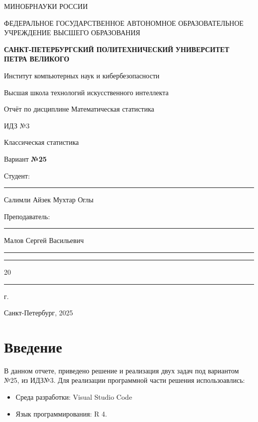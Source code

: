 \documentclass[areasetadvanced]{scrartcl}
\begin{document}
\sloppy
	\thispagestyle{empty}
	\begin{center}
		\large{МИНОБРНАУКИ РОССИИ} \par
		\vspace{0.3cm}
		\normalsize
		{ФЕДЕРАЛЬНОЕ ГОСУДАРСТВЕННОЕ АВТОНОМНОЕ ОБРАЗОВАТЕЛЬНОЕ УЧРЕЖДЕНИЕ ВЫСШЕГО ОБРАЗОВАНИЯ} \par
		\vspace{0.3cm}
		\textbf{\guillemotleft САНКТ-ПЕТЕРБУРГСКИЙ ПОЛИТЕХНИЧЕСКИЙ}
		\textbf{УНИВЕРСИТЕТ ПЕТРА ВЕЛИКОГО\guillemotright} \par
		\vspace{0.3cm}
		{Институт компьютерных наук и кибербезопасности}\par
		{Высшая школа технологий искусственного интеллекта}\par
	\end{center}
	\vfill
	\begin{center}
		{\large Отчёт по дисциплине \guillemotleft Математическая статистика\guillemotright}\par
		{\huge   ИДЗ №3
		
		\guillemotleft Классическая статистика\guillemotright}\par
            {\huge Вариант \textbf{№25}}
         
	\end{center}
	\vfill
	\begin{flushleft}
		Студент: \hspace{1.8cm} \rule[0pt]{2.5cm}{0.5pt}\hfill Салимли Айзек Мухтар Оглы\par
		\vspace{1.5cm}
		Преподаватель: \hspace{0.55cm} \rule[0pt]{2.5cm}{0.5pt}\hfill  Малов Сергей Васильевич
	\end{flushleft}
	\vspace{0.5cm}
	\begin{flushright}
		\guillemotleft \rule[0pt]{0.8cm}{0.5pt}\guillemotright \rule[0pt]{2cm}{0.5pt} 20\rule[0pt]{0.5cm}{0.5pt} г.
	\end{flushright}
	\vfill
	\begin{center}
		Санкт-Петербург, 2025
	\end{center}
	\newpage
	\tableofcontents
	\newpage
\section*{Введение}
В данном отчете, приведено решение и реализация двух задач под вариантом №25, из ИДЗ№3. Для реализации программной части решения использоавлись:
\begin{itemize}
    \item Среда разработки: Visual Studio Code
    \item Язык программирования: R 4.
\end{itemize}
\newpage
\end{document}
